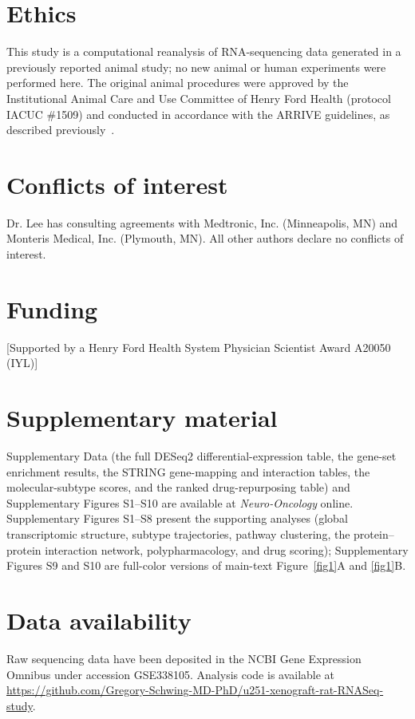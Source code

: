 \documentclass[unnumsec,webpdf,contemporary,large]{oup-authoring-template}
\begin{document}
\section*{Ethics}
This study is a computational reanalysis of RNA-sequencing data generated in a previously reported animal study; no new animal or human experiments were performed here. The original animal procedures were approved by the Institutional Animal Care and Use Committee of Henry Ford Health (protocol IACUC \#1509) and conducted in accordance with the ARRIVE guidelines, as described previously~\cite{NagarajaJNS}.

\section*{Conflicts of interest}
Dr. Lee has consulting agreements with Medtronic, Inc. (Minneapolis, MN) and Monteris Medical, Inc. (Plymouth, MN). All other authors declare no conflicts of interest.

\section*{Funding}
[Supported by a Henry Ford Health System Physician Scientist Award A20050 (IYL)]

\section*{Supplementary material}
Supplementary Data (the full DESeq2 differential-expression table, the gene-set enrichment results, the STRING gene-mapping and interaction tables, the molecular-subtype scores, and the ranked drug-repurposing table) and Supplementary Figures S1--S10 are available at \emph{Neuro-Oncology} online. Supplementary Figures S1--S8 present the supporting analyses (global transcriptomic structure, subtype trajectories, pathway clustering, the protein--protein interaction network, polypharmacology, and drug scoring); Supplementary Figures S9 and S10 are full-color versions of main-text Figure~\ref{fig1}A and \ref{fig1}B.

\section*{Data availability}
Raw sequencing data have been deposited in the NCBI Gene Expression Omnibus under accession GSE338105. Analysis code is available at \url{https://github.com/Gregory-Schwing-MD-PhD/u251-xenograft-rat-RNASeq-study}.
\end{document}

